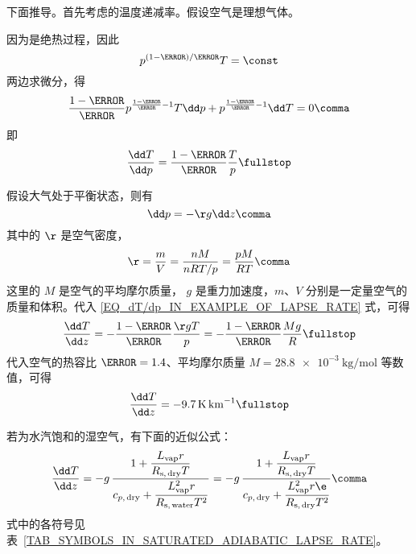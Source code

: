     \begin{myExample}[海拔与气温的关系]
      下面推导。首先考虑的温度递减率。假设空气是理想气体。
      
      因为是绝热过程，因此
      \begin{equation}
        p^{(1 - \g) / \g} T = \const
      \end{equation}
      两边求微分，得
      \begin{equation}
        \frac{1 - \g}{\g} p^{\frac{1 - \g}{\g} - 1} T \dd p + p^{\frac{1 - \g}{\g} - 1} \dd T = 0 \comma
      \end{equation}
      即
      \begin{equation} \label{EQ_dT/dp_IN_EXAMPLE_OF_LAPSE_RATE}
        \frac{\dd T}{\dd p} = \frac{1 - \g}{\g} \frac{T}{p} \fullstop
      \end{equation}
      
      假设大气处于平衡状态，则有
      \begin{equation}
        \dd p = -\r g \dd z \comma
      \end{equation}
      其中的 $\r$ 是空气密度，
      \begin{equation}
        \r = \frac{m}{V} = \frac{n M}{n R T / p} = \frac{p M}{R T} \comma
      \end{equation}
      这里的 $M$ 是空气的平均摩尔质量， $g$ 是重力加速度，$m$、$V$ 分别是一定量空气的质量和体积。代入 \eqref{EQ_dT/dp_IN_EXAMPLE_OF_LAPSE_RATE} 式，可得
      \begin{equation}
        \frac{\dd T}{\dd z} = -\frac{1 - \g}{\g} \frac{\r g T}{p} = -\frac{1 - \g}{\g} \frac{M g}{R} \fullstop
      \end{equation}
      代入空气的热容比 $\g = 1.4$、平均摩尔质量 $M = \SI{28.8e-3}{\kg\per\mol}$ 等数值，可得
      \begin{equation}
        \frac{\dd T}{\dd z} = \SI{-9.7}{\kelvin\per\km} \fullstop
      \end{equation}
      
      \blankline
      
      若为水汽饱和的湿空气，有下面的近似公式：%
      \begin{equation} \label{EQ_SATURATED_ADIABATIC_LAPSE_RATE}
        \frac{\dd T}{\dd z}
        = -g \, \frac{1 + \dfrac{L_\text{vap} r}{R_\text{s,\,dry} T}}{c_{p,\,\text{dry}} + \dfrac{L_\text{vap}^2 r}{R_\text{s,\,water} T^2}}
        = -g \, \frac{1 + \dfrac{L_\text{vap} r}{R_\text{s,\,dry} T}}{c_{p,\,\text{dry}} + \dfrac{L_\text{vap}^2 r \e}{R_\text{s,\,dry} T^2}} \comma
      \end{equation}
      式中的各符号见表~\ref{TAB_SYMBOLS_IN_SATURATED_ADIABATIC_LAPSE_RATE}。%
      

\end{myExample}
